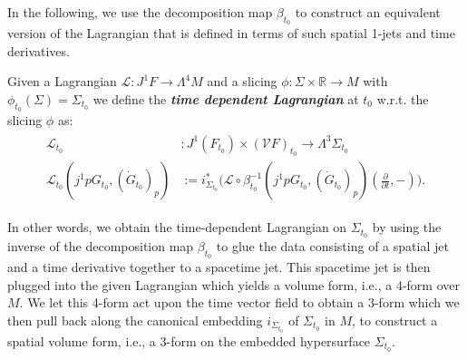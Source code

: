 In the following, we use the decomposition map $\beta_{t_0}$ to construct an equivalent version of the Lagrangian that is defined in terms of such spatial 1-jets and time derivatives. 
\begin{definition}
Given a Lagrangian $\mathcal{L} : J^1F \rightarrow \Lambda^4M$ and a slicing $\phi : \Sigma \times \mathbb{R} \rightarrow M$ with $\phi_{t_0}(\Sigma) = \Sigma_{t_0}$ we define the \textbf{\textit{time dependent Lagrangian}} at $t_0$ w.r.t. the slicing $\phi$ as:
\begin{align}
\begin{aligned}
    \mathcal{L}_{t_0} &: J^1(F_{t_0}) \times (\mathcal{V}F)_{t_0} \longrightarrow \Lambda^3\Sigma_{t_0}\\
    \mathcal{L}_{t_0}(j^1pG_{t_0}, (\dot{G}_{t_0})_p) &:= i_{\Sigma_{t_0}}^{\ast} \bigl( \mathcal{L}\circ \beta_{t_0}^{-1}(j^1pG_{t_0}, (\dot{G}_{t_0})_p)(\frac{\partial}{\partial t},-)\bigr). 
\end{aligned}
\end{align}
\end{definition}

In other words, we obtain the time-dependent Lagrangian on $\Sigma_{t_0}$ by using the inverse of the decomposition map $\beta_{t_0}$ to glue the data consisting of a spatial jet and a time derivative together to a spacetime jet. This spacetime jet is then plugged into the given Lagrangian which yields a volume form, i.e., a 4-form over $M$. We let this 4-form act upon the time vector field to obtain a 3-form which we then pull back along the canonical embedding $i_{\Sigma_{t_0}}$ of $\Sigma_{t_0}$ in $M$, to construct a spatial volume form, i.e., a 3-form on the embedded hypersurface $\Sigma_{t_0}$. 

